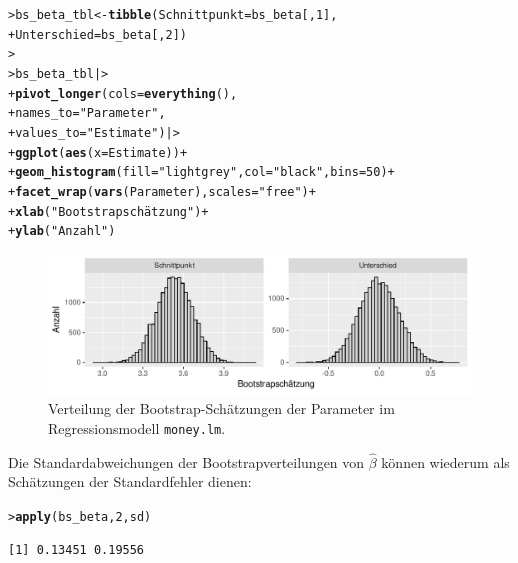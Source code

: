 \documentclass[oneside, 10pt]{book}\usepackage[]{graphicx}\usepackage[]{xcolor}
\makeatletter
\newcommand{\hlnum}[1]{\textcolor[rgb]{0.686,0.059,0.569}{#1}}%
\newcommand{\hlstr}[1]{\textcolor[rgb]{0.192,0.494,0.8}{#1}}%
\newcommand{\hlopt}[1]{\textcolor[rgb]{0,0,0}{#1}}%
\newcommand{\hlstd}[1]{\textcolor[rgb]{0.345,0.345,0.345}{#1}}%
\newcommand{\hlkwb}[1]{\textcolor[rgb]{0.69,0.353,0.396}{#1}}%
\newcommand{\hlkwc}[1]{\textcolor[rgb]{0.333,0.667,0.333}{#1}}%
\newcommand{\hlkwd}[1]{\textcolor[rgb]{0.737,0.353,0.396}{\textbf{#1}}}%
\newenvironment{kframe}{%
 \def\at@end@of@kframe{}%
 \ifinner\ifhmode%
  \def\at@end@of@kframe{\end{minipage}}%
  \begin{minipage}{\columnwidth}%
 \fi\fi%
 \def\FrameCommand##1{\hskip\@totalleftmargin \hskip-\fboxsep
 \colorbox{shadecolor}{##1}\hskip-\fboxsep
     \hskip-\linewidth \hskip-\@totalleftmargin \hskip\columnwidth}%
 \MakeFramed {\advance\hsize-\width
   \@totalleftmargin\z@ \linewidth\hsize
   \@setminipage}}%
 {\par\unskip\endMakeFramed%
 \at@end@of@kframe}
\newenvironment{knitrout}{}{} %
\makeatother
\begin{document}
\begin{knitrout}
\color{fgcolor}\begin{kframe}
\begin{alltt}
\hlstd{> }\hlstd{bs_beta_tbl} \hlkwb{<-} \hlkwd{tibble}\hlstd{(}\hlkwc{Schnittpunkt} \hlstd{= bs_beta[,} \hlnum{1}\hlstd{],}
\hlstd{+ }                      \hlkwc{Unterschied} \hlstd{= bs_beta[,} \hlnum{2}\hlstd{])}
\hlstd{> }
\hlstd{> }\hlstd{bs_beta_tbl |>}
\hlstd{+ }  \hlkwd{pivot_longer}\hlstd{(}\hlkwc{cols} \hlstd{=} \hlkwd{everything}\hlstd{(),}
\hlstd{+ }               \hlkwc{names_to} \hlstd{=} \hlstr{"Parameter"}\hlstd{,}
\hlstd{+ }               \hlkwc{values_to} \hlstd{=} \hlstr{"Estimate"}\hlstd{) |>}
\hlstd{+ }  \hlkwd{ggplot}\hlstd{(}\hlkwd{aes}\hlstd{(}\hlkwc{x} \hlstd{= Estimate))} \hlopt{+}
\hlstd{+ }  \hlkwd{geom_histogram}\hlstd{(}\hlkwc{fill} \hlstd{=} \hlstr{"lightgrey"}\hlstd{,} \hlkwc{col} \hlstd{=} \hlstr{"black"}\hlstd{,} \hlkwc{bins} \hlstd{=} \hlnum{50}\hlstd{)} \hlopt{+}
\hlstd{+ }  \hlkwd{facet_wrap}\hlstd{(}\hlkwd{vars}\hlstd{(Parameter),} \hlkwc{scales} \hlstd{=} \hlstr{"free"}\hlstd{)} \hlopt{+}
\hlstd{+ }  \hlkwd{xlab}\hlstd{(}\hlstr{"Bootstrapschätzung"}\hlstd{)} \hlopt{+}
\hlstd{+ }  \hlkwd{ylab}\hlstd{(}\hlstr{"Anzahl"}\hlstd{)}
\end{alltt}
\end{kframe}\begin{figure}[tp]

{\centering \includegraphics[width=.9\textwidth]{figs/unnamed-chunk-252-1} 

}

\caption{Verteilung der Bootstrap-Schätzungen der Parameter im Regressionsmodell \texttt{money.lm}.\label{fig:bootstrapdistributionmoney}}\label{fig:unnamed-chunk-252}
\end{figure}

\end{knitrout}
Die Standardabweichungen der Bootstrapverteilungen von $\widehat{\beta}$
können wiederum als Schätzungen der Standardfehler dienen:
\begin{knitrout}
\color{fgcolor}\begin{kframe}
\begin{alltt}
\hlstd{> }\hlkwd{apply}\hlstd{(bs_beta,} \hlnum{2}\hlstd{, sd)}
\end{alltt}
\begin{verbatim}
[1] 0.13451 0.19556
\end{verbatim}
\end{kframe}
\end{knitrout}
\end{document}
